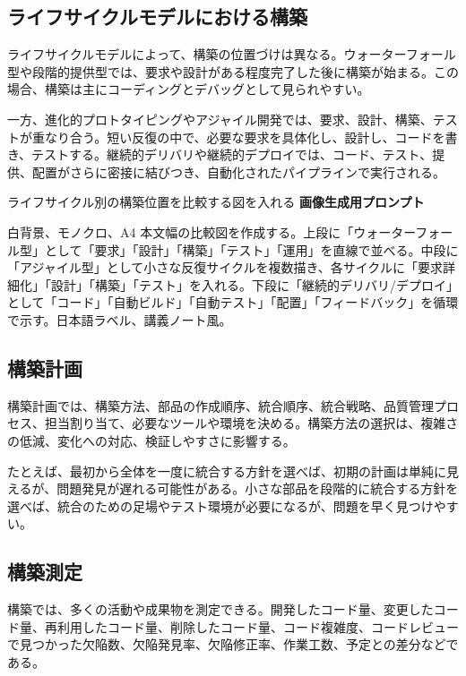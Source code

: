 \documentclass[a4paper,11pt,ja=standard,xelatex]{bxjsarticle}
\begin{document}
\subsection{ライフサイクルモデルにおける構築}

ライフサイクルモデルによって、構築の位置づけは異なる。ウォーターフォール型や段階的提供型では、要求や設計がある程度完了した後に構築が始まる。この場合、構築は主にコーディングとデバッグとして見られやすい。

一方、進化的プロトタイピングやアジャイル開発では、要求、設計、構築、テストが重なり合う。短い反復の中で、必要な要求を具体化し、設計し、コードを書き、テストする。継続的デリバリや継続的デプロイでは、コード、テスト、提供、配置がさらに密接に結びつき、自動化されたパイプラインで実行される。

\begin{todobox}{ライフサイクル別の構築位置を比較する図を入れる}
\textbf{画像生成用プロンプト}

白背景、モノクロ、A4 本文幅の比較図を作成する。上段に「ウォーターフォール型」として「要求」「設計」「構築」「テスト」「運用」を直線で並べる。中段に「アジャイル型」として小さな反復サイクルを複数描き、各サイクルに「要求詳細化」「設計」「構築」「テスト」を入れる。下段に「継続的デリバリ/デプロイ」として「コード」「自動ビルド」「自動テスト」「配置」「フィードバック」を循環で示す。日本語ラベル、講義ノート風。
\end{todobox}

\subsection{構築計画}

構築計画では、構築方法、部品の作成順序、統合順序、統合戦略、品質管理プロセス、担当割り当て、必要なツールや環境を決める。構築方法の選択は、複雑さの低減、変化への対応、検証しやすさに影響する。

たとえば、最初から全体を一度に統合する方針を選べば、初期の計画は単純に見えるが、問題発見が遅れる可能性がある。小さな部品を段階的に統合する方針を選べば、統合のための足場やテスト環境が必要になるが、問題を早く見つけやすい。

\subsection{構築測定}

構築では、多くの活動や成果物を測定できる。開発したコード量、変更したコード量、再利用したコード量、削除したコード量、コード複雑度、コードレビューで見つかった欠陥数、欠陥発見率、欠陥修正率、作業工数、予定との差分などである。
\end{document}
